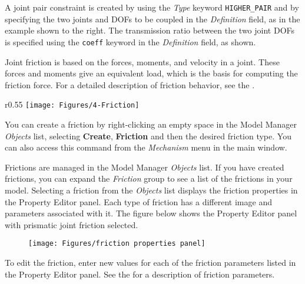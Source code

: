 A joint pair constraint is created by using the {\sl Type} keyword
{\tt HIGHER\_PAIR} and by specifying the two joints and DOFs to be coupled
in the {\sl Definition} field, as in the example shown to the right.
The transmission ratio between the two joint DOFs is specified using the
{\tt coeff} keyword in the {\sl Definition} field, as shown.




Joint friction is based on the forces, moments, and velocity in a joint.
These forces and moments give an equivalent load,
which is the basis for computing the friction force.
For a detailed description of friction behavior,
see the .

\begin{wrapfigure}[8]{r}{0.55\textwidth}
  \vspace{-4mm}
  \texttt{[image: Figures/4-Friction]}
\end{wrapfigure}

You can create a friction by right-clicking an empty space in the Model
Manager {\sl Objects} list, selecting \textbf{Create}, \textbf{Friction} and
then the desired friction type. You can also access this command from the
{\sl Mechanism} menu in the main window.

Frictions are managed in the Model Manager {\sl Objects} list.
If you have created frictions, you can expand the {\sl Friction} group to see
a list of the frictions in your model.
Selecting a friction from the {\sl Objects} list displays the friction
properties in the Property Editor panel. Each type of friction has a different
image and parameters associated with it. The figure below shows the
Property Editor panel with prismatic joint friction selected.

\clearpage
\begin{figure}[H]
  \texttt{[image: Figures/friction properties panel]}
\end{figure}

To edit the friction, enter new values for each of the friction parameters
listed in the Property Editor panel.
See the 
for a description of friction parameters.

